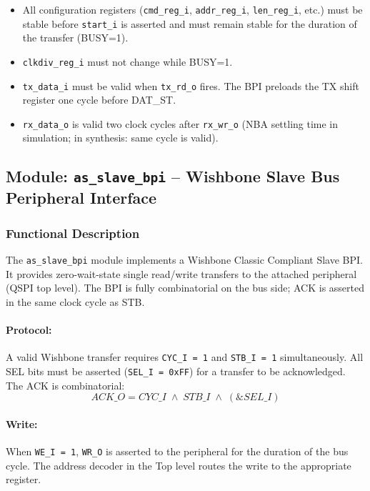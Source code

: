 \begin{itemize}
  \item All configuration registers (\texttt{cmd\_reg\_i}, \texttt{addr\_reg\_i},
    \texttt{len\_reg\_i}, etc.) must be stable before \texttt{start\_i} is asserted
    and must remain stable for the duration of the transfer (BUSY=1).
  \item \texttt{clkdiv\_reg\_i} must not change while BUSY=1.
  \item \texttt{tx\_data\_i} must be valid when \texttt{tx\_rd\_o} fires. The BPI
    preloads the TX shift register one cycle before DAT\_ST.
  \item \texttt{rx\_data\_o} is valid two clock cycles after \texttt{rx\_wr\_o}
    (NBA settling time in simulation; in synthesis: same cycle is valid).
\end{itemize}

\subsection{Module: \texttt{as\_slave\_bpi} -- Wishbone Slave Bus Peripheral Interface}
\label{subsec:asqspi_bpi}

\subsubsection{Functional Description}

The \texttt{as\_slave\_bpi} module implements a Wishbone Classic Compliant Slave
BPI. It provides zero-wait-state single read/write transfers to the attached
peripheral (QSPI top level). The BPI is fully combinatorial on the bus side;
ACK is asserted in the same clock cycle as STB.

\paragraph{Protocol:}
A valid Wishbone transfer requires \texttt{CYC\_I = 1} and \texttt{STB\_I = 1}
simultaneously. All SEL bits must be asserted (\texttt{SEL\_I = 0xFF}) for a
transfer to be acknowledged. The ACK is combinatorial:
\[
  ACK\_O = CYC\_I \;\land\; STB\_I \;\land\; (\&SEL\_I)
\]

\paragraph{Write:}
When \texttt{WE\_I = 1}, \texttt{WR\_O} is asserted to the peripheral for the
duration of the bus cycle. The address decoder in the Top level routes the write
to the appropriate register.

